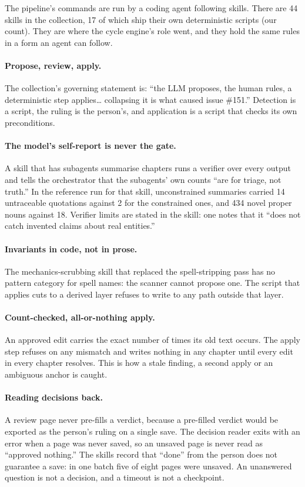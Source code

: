 \documentclass[11pt]{article}
\begin{document}
The pipeline's commands are run by a coding agent following skills. There are 44 skills
in the collection, 17 of which ship their own deterministic scripts (our count). They
are where the cycle engine's role went, and they hold the same rules in a form an agent
can follow.

\paragraph{Propose, review, apply.} The collection's governing statement is: ``the LLM
proposes, the human rules, a deterministic step applies\ldots{} collapsing it is what
caused issue \#151.'' Detection is a script, the ruling is the person's, and application
is a script that checks its own preconditions.

\paragraph{The model's self-report is never the gate.} A skill that has subagents
summarise chapters runs a verifier over every output and tells the orchestrator that the
subagents' own counts ``are for triage, not truth.'' In the reference run for that skill,
unconstrained summaries carried 14 untraceable quotations against 2 for the constrained
ones, and 434 novel proper nouns against 18. Verifier limits are stated in the skill:
one notes that it ``does not catch invented claims about real entities.''

\paragraph{Invariants in code, not in prose.} The mechanics-scrubbing skill that replaced
the spell-stripping pass has no pattern category for spell names: the scanner cannot
propose one. The script that applies cuts to a derived layer refuses to write to any
path outside that layer.

\paragraph{Count-checked, all-or-nothing apply.} An approved edit carries the exact
number of times its old text occurs. The apply step refuses on any mismatch and writes
nothing in any chapter until every edit in every chapter resolves. This is how a stale
finding, a second apply or an ambiguous anchor is caught.

\paragraph{Reading decisions back.} A review page never pre-fills a verdict, because a
pre-filled verdict would be exported as the person's ruling on a single save. The
decision reader exits with an error when a page was never saved, so an unsaved page is
never read as ``approved nothing.'' The skills record that ``done'' from the person does
not guarantee a save: in one batch five of eight pages were unsaved. An unanswered
question is not a decision, and a timeout is not a checkpoint.
\end{document}
